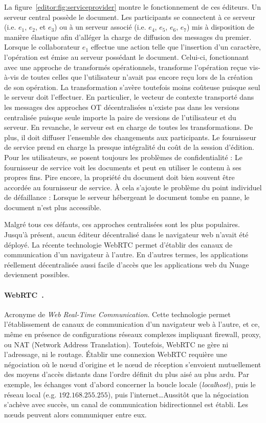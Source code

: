 La figure~\ref{editor:fig:serviceprovider} montre le fonctionnement de ces
éditeurs. Un serveur central possède le document. Les participants se connectent
à ce serveur (i.e. $e_1$, $e_2$, et $e_3$) ou à un serveur associé (i.e. $e_4$,
$e_5$, $e_6$, $e_7$) mis à disposition de manière élastique afin d'alléger la
charge de diffusion des messages du premier. Lorsque le collaborateur $e_1$
effectue une action telle que l'insertion d'un caractère, l'opération est émise
au serveur possédant le document. Celui-ci, fonctionnant avec une approche de
transformés opérationnels, transforme l'opération reçue vis-à-vis de toutes
celles que l'utilisateur n'avait pas encore reçu lors de la création de son
opération. La transformation s'avère toutefois moins coûteuse puisque seul le
serveur doit l'effectuer. En particulier, le vecteur de contexte transporté dans
les messages des approches OT décentralisées n'existe pas dans les versions
centralisée puisque seule importe la paire de versions de l'utilisateur et du
serveur. En revanche, le serveur est en charge de toutes les transformations. De
plus, il doit diffuser l'ensemble des changements aux participants. Le
fournisseur de service prend en charge la presque intégralité du coût de la
session d'édition. Pour les utilisateurs, se posent toujours les problèmes de
confidentialité : Le fournisseur de service voit les documents et peut en
utiliser le contenu à ses propres fins. Pire encore, la propriété du document
doit bien souvent être accordée au fournisseur de service. À cela s'ajoute le
problème du point individuel de défaillance : Lorsque le serveur hébergeant le
document tombe en panne, le document n'est plus accessible.

Malgré tous ces défauts, ces approches centralisées sont les plus populaires.
Jusqu'à présent, aucun éditeur décentralisé dans le navigateur web n'avait été
déployé. La récente technologie WebRTC permet d'établir des canaux de
communication d'un navigateur à l'autre. En d'autres termes, les applications
réellement décentralisée aussi facile d'accès que les applications web du Nuage
deviennent possibles.

\paragraph{WebRTC~\cite{webrtc}.} Acronyme de \emph{Web Real-Time
  Communication}.  Cette technologie permet l'établissement de canaux de
communication d'un navigateur web à l'autre, et ce, même en présence de
configurations réseaux complexes impliquant firewall, proxy, ou NAT (Network
Address Translation). Toutefois, WebRTC ne gère ni l'adressage, ni le routage.
Établir une connexion WebRTC requière une négociation où le nœud d'origine et le
nœud de réception s'envoient mutuellement des moyens d'accès distants dans
l'ordre définit du plus aisé au plus ardu. Par exemple, les échanges vont
d'abord concerner la boucle locale (\emph{localhost}), puis le réseau local
(e.g. $192.168.255.255$), puis l'internet\ldots Aussitôt que la négociation
s'achève avec succès, un canal de communication bidirectionnel est établi. Les
nœuds peuvent alors communiquer entre eux.

